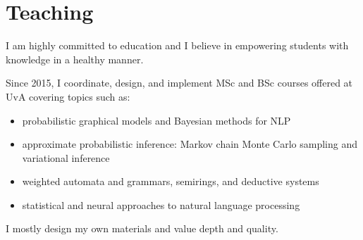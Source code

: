 \section*{Teaching}


I am highly committed to education and I believe in empowering students with knowledge in a healthy manner. %

Since 2015, I coordinate, design, and implement MSc and BSc courses offered at UvA covering topics such as:
\begin{itemize}
	\setlength\itemsep{1pt}
	\item probabilistic graphical models and Bayesian methods for NLP
	\item approximate probabilistic inference: Markov chain Monte Carlo sampling and variational inference
	\item weighted automata and grammars, semirings, and deductive systems
	\item statistical and neural approaches to natural language processing
\end{itemize}
I mostly design my own materials and value depth and quality. 


